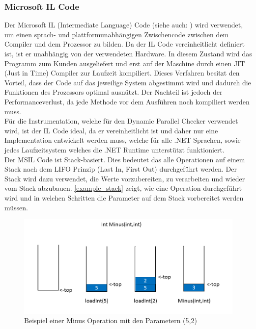 \documentclass[10pt,a4paper]{article}
\begin{document}
\subsubsection{Microsoft IL Code}\label{chapter_IL}
\begin{flushleft}
Der Microsoft IL (Intermediate Language) Code (siehe auch: \cite{ecma}) wird verwendet, um einen sprach- und plattformunabhängigen Zwischencode zwischen dem Compiler und dem Prozessor zu bilden. Da der IL Code vereinheitlicht definiert ist, ist er unabhängig von der verwendeten Hardware. In diesem Zustand wird das Programm zum Kunden ausgeliefert und erst auf der Maschine durch einen JIT (Just in Time) Compiler zur Laufzeit kompiliert. Dieses Verfahren besitzt den Vorteil, dass der Code auf das jeweilige System abgestimmt wird und dadurch die Funktionen des Prozessors optimal ausnützt. Der Nachteil ist jedoch der Performanceverlust, da jede Methode vor dem Ausführen noch kompiliert werden muss.\\
Für die Instrumentation, welche für den Dynamic Parallel Checker verwendet wird, ist der IL Code ideal, da er vereinheitlicht ist und daher nur eine Implementation entwickelt werden muss, welche für alle .NET Sprachen, sowie jedes Laufzeitsystem welches die .NET Runtime unterstützt funktioniert.\\
Der MSIL Code ist Stack-basiert. Dies bedeutet das alle Operationen auf einem Stack nach dem LIFO Prinzip (Last In, First Out) durchgeführt werden. Der Stack wird dazu verwendet, die Werte vorzubereiten, zu verarbeiten und wieder vom Stack abzubauen. \autoref{example_stack} zeigt, wie eine Operation durchgeführt wird und in welchen Schritten die Parameter auf dem Stack vorbereitet werden müssen.\\
\begin{figure}[H]
\centering
\includegraphics[scale=0.5]{images/BeispielStack.png}
\caption{Beispiel einer Minus Operation mit den Parametern (5,2)}
\label{example_stack}

\end{figure}
\end{flushleft}
\end{document}
